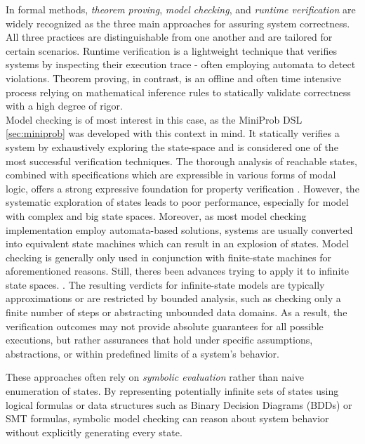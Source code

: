 \documentclass[11pt]{report}
\begin{document}
In formal methods, \textit{theorem proving}, \textit{model checking}, and \textit{runtime verification} are widely recognized as the three main approaches for assuring
system correctness\cite{formalMethodsBig3,formalMethodsCPSCritical}.
All three practices are distinguishable from one another and are tailored for certain scenarios. Runtime verification is a lightweight technique that verifies systems 
by inspecting their execution trace - often employing automata to detect violations. Theorem proving, in contrast, is an offline and often time intensive 
process relying on mathematical inference rules to statically validate correctness with a high degree of rigor.\\

Model checking is of most interest in this case, as the MiniProb DSL \ref{sec:miniprob} was developed with this context in mind. \cite{POPACheck}
It statically verifies a system by exhaustively exploring the state-space and is considered one of the most successful verification techniques. \cite{formalMethodsCPSCritical}
The thorough analysis of reachable states, combined with specifications which are expressible in various forms of modal logic,
offers a strong expressive foundation for property verification \cite{modelCheckingPrinceples}. However, the systematic exploration of states leads to poor performance, especially for model with
complex and big state spaces. Moreover, as most model checking implementation employ automata-based solutions, systems are usually converted into
equivalent state machines which can result in an explosion of states.\cite{}
Model checking is generally only used in conjunction with finite-state machines for aforementioned reasons. Still, theres been advances trying to apply it to infinite state spaces.
\cite{modelCheckingInfCounter,modelCheckingInfSymb}. The resulting verdicts for infinite-state models are typically approximations or are restricted by bounded analysis,
such as checking only a finite number of steps or abstracting unbounded data domains. As a result, the verification outcomes may not provide absolute guarantees for all
possible executions, but rather assurances that hold under specific assumptions, abstractions, or within predefined limits of a system's behavior.

These approaches often rely on \textit{symbolic evaluation} rather than naive enumeration of states. By representing potentially infinite sets of states using logical 
formulas or data structures such as Binary Decision Diagrams (BDDs) or SMT formulas, symbolic model checking can reason about system behavior without explicitly
generating every state.
\end{document}
